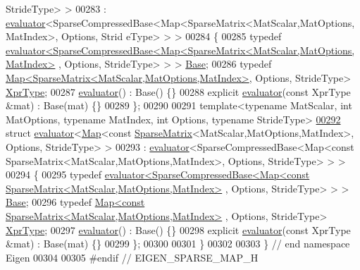 \begin{DoxyCode}
      StrideType> >
00283   : \hyperlink{struct_eigen_1_1internal_1_1evaluator}{evaluator}<SparseCompressedBase<Map<SparseMatrix<MatScalar,MatOptions,MatIndex>, Options, Strid
      eType> > >
00284 \{
00285   \textcolor{keyword}{typedef} 
      \hyperlink{struct_eigen_1_1internal_1_1evaluator}{evaluator<SparseCompressedBase<Map<SparseMatrix<MatScalar,MatOptions,MatIndex>}
      , Options, StrideType> > > \hyperlink{struct_eigen_1_1internal_1_1evaluator}{Base};
00286   \textcolor{keyword}{typedef} \hyperlink{group___core___module_class_eigen_1_1_map}{Map<SparseMatrix<MatScalar,MatOptions,MatIndex>}, 
      Options, StrideType> \hyperlink{group___sparse_core___module_class_eigen_1_1_map_3_01_sparse_matrix_3_01_mat_scalar_00_01_mat_options_00_01_mat_index_01_4_002c859b470cc9e43a031929bd752a93e6}{XprType};  
00287   \hyperlink{struct_eigen_1_1internal_1_1evaluator}{evaluator}() : Base() \{\}
00288   \textcolor{keyword}{explicit} \hyperlink{struct_eigen_1_1internal_1_1evaluator}{evaluator}(\textcolor{keyword}{const} XprType &mat) : Base(mat) \{\}
00289 \};
00290 
00291 \textcolor{keyword}{template}<\textcolor{keyword}{typename} MatScalar, \textcolor{keywordtype}{int} MatOptions, \textcolor{keyword}{typename} MatIndex, \textcolor{keywordtype}{int} Options, \textcolor{keyword}{typename} Str\textcolor{keywordtype}{id}eType>
\hyperlink{struct_eigen_1_1internal_1_1evaluator_3_01_map_3_01const_01_sparse_matrix_3_01_mat_scalar_00_01_0f7d77d8dc2e7e7ccd8fbd3de5b937dd}{00292} \textcolor{keyword}{struct }\hyperlink{struct_eigen_1_1internal_1_1evaluator}{evaluator}<\hyperlink{group___core___module_class_eigen_1_1_map}{Map}<const \hyperlink{group___sparse_core___module_class_eigen_1_1_sparse_matrix}{SparseMatrix}<MatScalar,MatOptions,MatIndex>, Options, 
      StrideType> >
00293   : \hyperlink{struct_eigen_1_1internal_1_1evaluator}{evaluator}<SparseCompressedBase<Map<const SparseMatrix<MatScalar,MatOptions,MatIndex>, Options,
       StrideType> > >
00294 \{
00295   \textcolor{keyword}{typedef} 
      \hyperlink{struct_eigen_1_1internal_1_1evaluator}{evaluator<SparseCompressedBase<Map<const SparseMatrix<MatScalar,MatOptions,MatIndex>}
      , Options, StrideType> > > \hyperlink{struct_eigen_1_1internal_1_1evaluator}{Base};
00296   \textcolor{keyword}{typedef} \hyperlink{group___core___module_class_eigen_1_1_map}{Map<const SparseMatrix<MatScalar,MatOptions,MatIndex>}
      , Options, StrideType> \hyperlink{class_eigen_1_1_map_3_01const_01_sparse_matrix_3_01_mat_scalar_00_01_mat_options_00_01_mat_index4032bba20cf92aab8bcf07e926e15a4f}{XprType};  
00297   \hyperlink{struct_eigen_1_1internal_1_1evaluator}{evaluator}() : Base() \{\}
00298   \textcolor{keyword}{explicit} \hyperlink{struct_eigen_1_1internal_1_1evaluator}{evaluator}(\textcolor{keyword}{const} XprType &mat) : Base(mat) \{\}
00299 \};
00300 
00301 \}
00302 
00303 \} \textcolor{comment}{// end namespace Eigen}
00304 
00305 \textcolor{preprocessor}{#endif // EIGEN\_SPARSE\_MAP\_H}
\end{DoxyCode}
